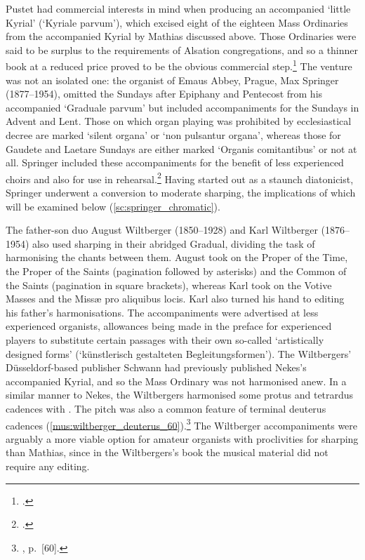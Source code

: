 Pustet had commercial interests in mind when producing an  accompanied `little Kyrial' (`Kyriale parvum'), which excised eight of the eighteen Mass Ordinaries from the accompanied Kyrial by Mathias discussed above.
Those Ordinaries were said to be surplus to the requirements of Alsation congregations, and so a thinner book at a reduced price proved to be the obvious commercial step.\footcite[50--51]{WeinmannOrgelbegleitungGradualeRomanum1911}
%
%
The venture was not an isolated one: the organist of Emaus Abbey, Prague, Max Springer (1877--1954), omitted the Sundays after Epiphany and Pentecost from his accompanied `Graduale parvum' but included accompaniments for the Sundays in Advent and Lent.
Those on which organ playing was prohibited by ecclesiastical decree are marked `silent organa' or `non pulsantur organa', whereas those for Gaudete and Laetare Sundays are either marked `Organis comitantibus' or not at all.
Springer included these accompaniments for the benefit of less experienced choirs and also for use in rehearsal.\footcite[1, 4, 8, 11, 50, 53, 58]{SpringerOrganumcomitansad1910}
Having started out as a staunch diatonicist, Springer underwent a conversion to moderate sharping, the implications of which will be examined below (\cref{sc:springer_chromatic}).

The father-son duo August Wiltberger (1850--1928) and Karl Wiltberger (1876--1954) also used sharping in their abridged Gradual, dividing the task of harmonising the chants between them.
August took on the Proper of the Time, the Proper of the Saints (pagination followed by asterisks) and the Common of the Saints (pagination in square brackets), whereas Karl took on the Votive Masses and the Missæ pro aliquibus locis.
Karl also turned his hand to editing his father's harmonisations.
The accompaniments were advertised at less experienced organists, allowances being made in the preface for experienced players to substitute certain passages with their own so-called `artistically designed forms' (`künstlerisch gestalteten Begleitungsformen').
The Wiltbergers' Düsseldorf-based publisher Schwann had previously published Nekes's accompanied Kyrial, and so the Mass Ordinary was not harmonised anew.
In a similar manner to Nekes, the Wiltbergers harmonised some protus and tetrardus cadences  \rightarrow{}  with \kern 1pt\sharp{}.
The pitch \kern 1pt\sharp{} was also a common feature of terminal deuterus cadences (\cref{mus:wiltberger_deuterus_60}).\footnote{\cite{WiltbergerOrganumcomitansad1910}, p.~[60].}
The Wiltberger accompaniments were arguably a more viable option for amateur organists with proclivities for sharping than Mathias, since in the Wiltbergers's book the musical material did not require any editing.

